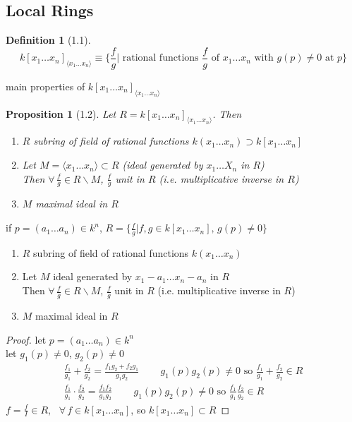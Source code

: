 \documentclass[10pt]{amsart}
\newtheorem{proposition}{Proposition}
\newtheorem{definition}{Definition}
\newcommand{\exercisehead}[1]
  { \smallskip
   \noindent{\small\bf Exercise #1.}
  }
\begin{document}
\begin{multicols*}{2}
\subsection{Local Rings}


\begin{definition}[1.1]
  \[
k[x_1 \dots x_n]_{\langle x_1 \dots x_n \rangle} \equiv \lbrace \frac{f}{g} | \text{ rational functions } \frac{f}{g} \text{ of } x_1 \dots x_n \text{ with } g(p) \neq 0 \text{ at } p \rbrace
\]
\end{definition}

main properties of $k[x_1 \dots x_n]_{\langle x_1 \dots x_n \rangle }$

\begin{proposition}[1.2]
  Let $R= k[x_1 \dots x_n]_{\langle x_1 \dots x_n \rangle }$.  Then
\begin{enumerate}
\item[(a)] $R$ subring of field of rational functions $k(x_1 \dots x_n) \supset k[x_1 \dots x_n]$
\item[(b)] Let $M=\langle x_1 \dots x_n \rangle \subset R$ (ideal generated by $x_1 \dots X_n$ in $R$) \\
Then $\forall \, \frac{f}{g} \in R \backslash M$, $\frac{f}{g}$ unit in $R$ (i.e. multiplicative inverse in $R$)
\item[(c)] $M$ maximal ideal in $R$
\end{enumerate}
\end{proposition}


\exercisehead{1} if $p=(a_1 \dots a_n) \in k^n$, $R = \lbrace \frac{f}{g} | f,g\in k[x_1 \dots x_n] , \, g(p) \neq 0 \rbrace$ 
\begin{enumerate}
\item[(a)] $R$ subring of field of rational functions $k(x_1 \dots x_n)$ 
\item[(b)] Let $M$ ideal generated by $x_1 - a_1 \dots x_n -a_n$ in $R$  \\
Then $\forall \, \frac{f}{g} \in R\backslash M$, $\frac{f}{g}$ unit in $R$ (i.e. multiplicative inverse in $R$)
\item[(c)]  $M$ maximal ideal in $R$
\end{enumerate}


\begin{proof}
let $p = (a_1 \dots a_n) \in k^n$ \\
let $g_1(p) \neq 0$, $g_2(p) \neq 0$ 
\[
\begin{gathered}
  \frac{f_1}{g_1 } + \frac{f_2}{g_2} = \frac{f_1 g_2 + f_2 g_1}{ g_1 g_2 } \quad \quad \,  g_1(p)g_2(p) \neq 0 \text{ so } \frac{f_1}{g_1} + \frac{f_2}{g_2} \in R \\
 \frac{f_1}{g_1} \cdot \frac{f_2}{g_2} = \frac{f_1 f_2}{g_1 g_2} \quad \quad \, g_1(p) g_2(p) \neq 0 \text{ so } \frac{f_1}{g_1}\frac{f_2}{g_2} \in R
\end{gathered}
\]
$f= \frac{f}{I} \in R$, \quad \, $\forall \, f\in k[x_1 \dots x_n]$, so $k[x_1 \dots x_n]\subset R$


\end{proof}
\end{multicols*}
\end{document}
